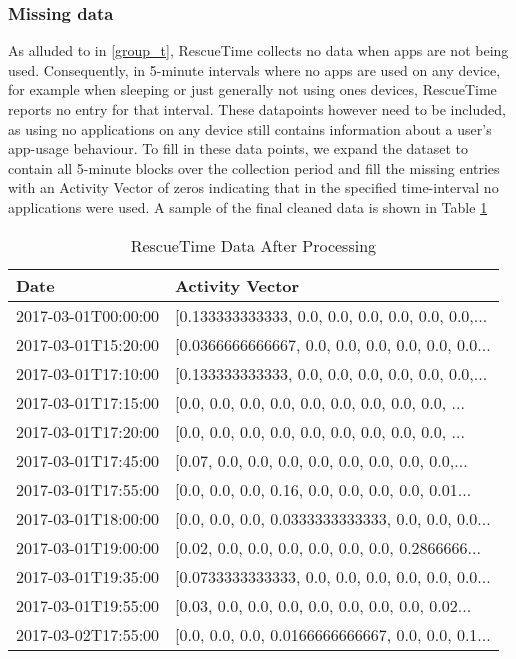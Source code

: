 \subsubsection{Missing data}
As alluded to in \ref{group_t}, RescueTime collects no data when apps are not being used. Consequently, in 5-minute intervals where no apps are used on any device, for example when sleeping or just generally not using ones devices, RescueTime reports no entry for that interval. These datapoints however need to be included, as using no applications on any device still contains information about a user's app-usage behaviour. To fill in these data points, we expand the dataset to contain all 5-minute blocks over the collection period and fill the missing entries with an Activity Vector of zeros indicating that in the specified time-interval no applications were used. A sample of the final cleaned data is shown in Table \ref{cleandata}


\begin{table}
\centering
\caption{RescueTime Data After Processing}
\label{cleandata}
\begin{tabular}{ll}
\hline
Date  &                       Activity Vector \\
\hline
2017-03-01T00:00:00 &  [0.133333333333, 0.0, 0.0, 0.0, 0.0, 0.0, 0.0,... \\
2017-03-01T15:20:00 &  [0.0366666666667, 0.0, 0.0, 0.0, 0.0, 0.0, 0.0... \\
2017-03-01T17:10:00 &  [0.133333333333, 0.0, 0.0, 0.0, 0.0, 0.0, 0.0,... \\
2017-03-01T17:15:00 &  [0.0, 0.0, 0.0, 0.0, 0.0, 0.0, 0.0, 0.0, 0.0, ... \\
2017-03-01T17:20:00 &  [0.0, 0.0, 0.0, 0.0, 0.0, 0.0, 0.0, 0.0, 0.0, ... \\
2017-03-01T17:45:00 &  [0.07, 0.0, 0.0, 0.0, 0.0, 0.0, 0.0, 0.0, 0.0,... \\
2017-03-01T17:55:00 &  [0.0, 0.0, 0.0, 0.16, 0.0, 0.0, 0.0, 0.0, 0.01... \\
2017-03-01T18:00:00 &  [0.0, 0.0, 0.0, 0.0333333333333, 0.0, 0.0, 0.0... \\
2017-03-01T19:00:00 &  [0.02, 0.0, 0.0, 0.0, 0.0, 0.0, 0.0, 0.2866666... \\
2017-03-01T19:35:00 &  [0.0733333333333, 0.0, 0.0, 0.0, 0.0, 0.0, 0.0... \\
2017-03-01T19:55:00 &  [0.03, 0.0, 0.0, 0.0, 0.0, 0.0, 0.0, 0.0, 0.02... \\
2017-03-02T17:55:00 &  [0.0, 0.0, 0.0, 0.0166666666667, 0.0, 0.0, 0.1... \\
\hline
\end{tabular}
\end{table}